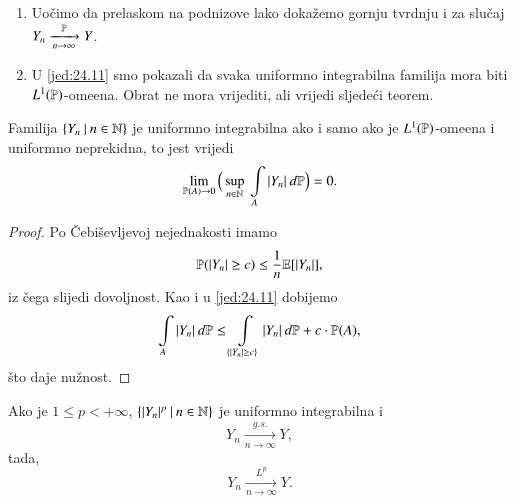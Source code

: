 \begin{nap} \label{nap:24.12}
    \begin{enumerate}[label=(\alph*)]
        \item \label{nap:24.12.1}
        Uo\v cimo da prelaskom na podnizove lako doka\v zemo gornju tvrdnju i za slu\v caj $Y_n \xrightarrow[n \to \infty]{\mathbb{P}} Y$.
        \item \label{nap:24.12.2}
        U \eqref{jed:24.11} smo pokazali da svaka uniformno integrabilna familija mora biti $L^1 (\mathbb{P})$-ome\dj ena.
        Obrat ne mora vrijediti, ali vrijedi sljede\' ci teorem.
    \end{enumerate}
\end{nap}

\begin{tm}  \label{tm:24.13}
    Familija $\{{Y_n} \: | \: {n \in \mathbb{N}}\}$ je uniformno integrabilna ako i samo ako je $L^1 (\mathbb{P})$-ome\dj ena i uniformno neprekidna, to jest vrijedi
    \begin{equation*}
        \lim\limits_{\mathbb{P} (A) \to 0} \Big( \sup\limits_{n \in \mathbb{N}} \: \int\limits_A |Y_n| \: d \mathbb{P} \Big) = 0.
    \end{equation*}
\end{tm}

\begin{proof}
    Po \v Cebi\v sevljevoj nejednakosti imamo
    \begin{equation*}
        \mathbb{P} ( |Y_n| \geq c) \leq \frac{1}{n} \mathbb{E} [|Y_n|],
    \end{equation*}
    iz \v cega slijedi dovoljnost.
    Kao i u \eqref{jed:24.11} dobijemo
    \begin{equation*}
        \int\limits_A |Y_n| \: d \mathbb{P} \leq \int\limits_{\{ |Y_n| \geq c \}} |Y_n| \: d \mathbb{P} + c \cdot \mathbb{P} ( A ),
    \end{equation*}
    \v sto daje nu\v znost.
\end{proof}

\begin{tm}  \label{tm:24.14}
    Ako je $1 \leq p < +\infty$, $\{{|Y_n|^p} \: | \: {n \in \mathbb{N}}\}$ je uniformno integrabilna i
    \begin{equation*}
        Y_n \xrightarrow[n \to \infty]{g.s.} Y,
    \end{equation*}
    tada,
    \begin{equation*}
        Y_n \xrightarrow[n \to \infty]{L^p} Y.
    \end{equation*}
\end{tm}

